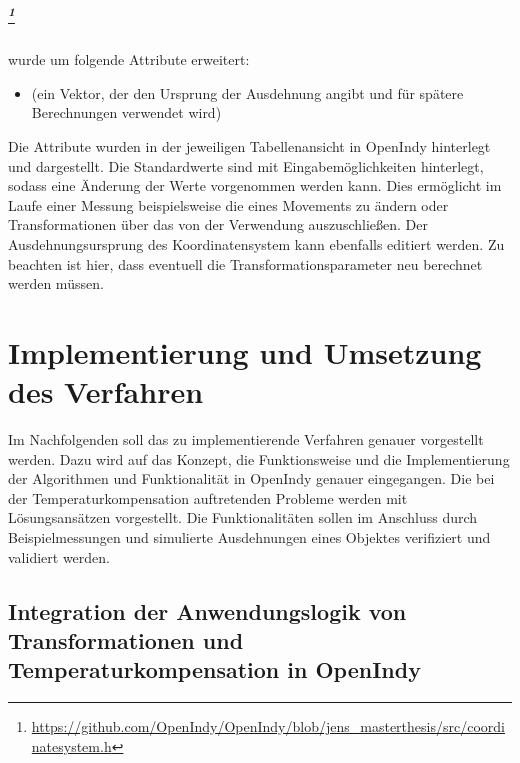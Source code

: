 \paragraph{\protect\footnote{\url{https://github.com/OpenIndy/OpenIndy/blob/jens_masterthesis/src/coordinatesystem.h}}} wurde um folgende Attribute erweitert:\\
\begin{itemize}
	\item {} (ein Vektor, der den Ursprung der Ausdehnung angibt und für spätere Berechnungen verwendet wird)
\end{itemize}

Die Attribute wurden in der jeweiligen Tabellenansicht in OpenIndy hinterlegt und dargestellt. Die Standardwerte sind mit Eingabemöglichkeiten hinterlegt, sodass eine Änderung der Werte vorgenommen werden kann. Dies ermöglicht im Laufe einer Messung beispielsweise die  eines Movements zu ändern oder Transformationen über das  von der Verwendung auszuschließen. Der Ausdehnungsursprung des Koordinatensystem kann ebenfalls editiert werden. Zu beachten ist hier, dass eventuell die Transformationsparameter neu berechnet werden müssen.

\chapter{Implementierung und Umsetzung des Verfahren}\label{chap:implementierung}

Im Nachfolgenden soll das zu implementierende Verfahren genauer vorgestellt werden. Dazu wird auf das Konzept, die Funktionsweise und die Implementierung der Algorithmen und Funktionalität in OpenIndy genauer eingegangen. Die bei der Temperaturkompensation auftretenden Probleme werden mit Lösungsansätzen vorgestellt. Die Funktionalitäten sollen im Anschluss durch Beispielmessungen und simulierte Ausdehnungen eines Objektes verifiziert und validiert werden.

\section{Integration der Anwendungslogik von Transformationen und Temperaturkompensation in OpenIndy}\label{sec:anwendungslogik}

